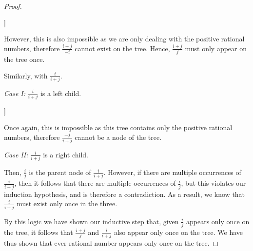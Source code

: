 \documentclass[11pt, leqno]{article}
\begin{document}
\begin{enumerate}
\begin{enumerate}[label=(\alph*)]
\begin{proof}
		\begin{center}
		\begin{forest}
		[$\frac{i + j}{-i}$
			[$\frac{i}{-i}$]
			[$\frac{i + j}{j}$]
		]
		\end{forest}
		\end{center}
		However, this is also impossible as we are only dealing with the positive rational numbers, therefore $\frac{i + j}{-i}$ cannot exist on the tree. Hence, $\frac{i + j}{j}$ must only appear on the tree once.
		
		Similarly, with $\frac{i}{i + j}$.
		
		\textit{Case I: } $\frac{i}{i + j}$ is a left child.
		
		\begin{center}
		\begin{forest}
		[$\frac{-j}{i + j}$
			[$\frac{i}{i + j}$]
			[$\frac{-j}{i}$]
		]
		\end{forest}
		\end{center}
	
	Once again, this is impossible as this tree contains only the positive rational numbers, therefore $\frac{-j}{i + j}$ cannot be a node of the tree.
	
	\textit{Case II: } $\frac{i}{i + j}$ is a right child.
	
	Then, $\frac{i}{j}$ is the parent node of $\frac{i}{i + j}$. However, if there are multiple occurrences of $\frac{i}{i + j}$, then it follows that there are multiple occurrences of $\frac{i}{j}$, but this violates our induction hypothesis, and is therefore a contradiction. As a result, we know that  $\frac{i}{i + j}$ must exist only once in the three.
	
	By this logic we have shown our inductive step that, given  $\frac{i}{j}$ appears only once on the tree, it follows that $\frac{i + j}{j}$ and $\frac{i}{i + j}$ also appear only once on the tree. We have thus shown that ever rational number appears only once on the tree.
	\end{proof}
	
	\end{enumerate}
	
\end{enumerate}
\end{document}

